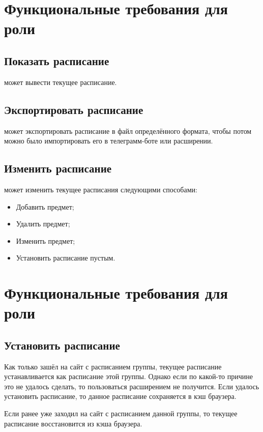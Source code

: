 	\section{Функциональные требования для роли }
		\subsection{Показать расписание}
			 может вывести текущее расписание.
		\subsection{Экспортировать расписание}
			 может экспортировать расписание в файл определённого формата, чтобы потом можно было импортировать его в телеграмм-боте или расширении.
		\subsection{Изменить расписание}
			 может изменить текущее расписания следующими способами:
			\begin{itemize}
				\item Добавить предмет;
				
				\item Удалить предмет;
				
				\item Изменить предмет;
				
				\item Установить расписание пустым.
			\end{itemize}
	\section{Функциональные требования для роли }
		\subsection{Установить расписание}
			Как только  зашёл на сайт с расписанием группы, текущее расписание устанавливается как расписание этой группы. Однако если по какой-то причине это не удалось сделать, то пользоваться расширением не получится. Если удалось установить расписание, то данное расписание сохраняется в кэш браузера.
			
			Если  ранее уже заходил на сайт с расписанием данной группы, то текущее расписание восстановится из кэша браузера.

